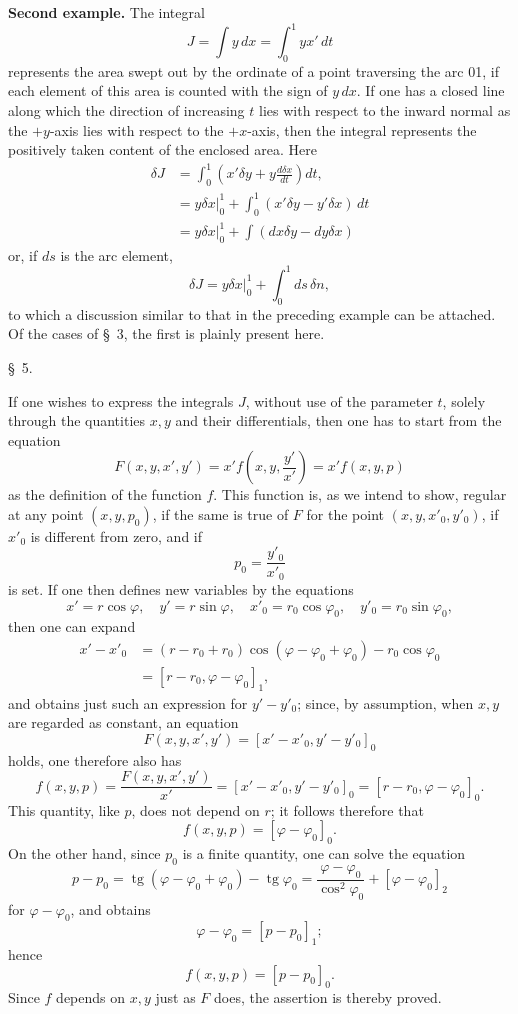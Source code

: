\documentclass[11pt,a4paper,leqno]{article}
\begin{document}
\medskip
\noindent\textbf{Second example.} The integral
\[
J=\int y\,dx=\int_0^1yx'\,dt
\]
represents the area swept out by the ordinate of a point traversing the arc 01, if each element of this area is counted with the sign of \(y\,dx\). If one has a closed line along which the direction of increasing \(t\) lies with respect to the inward normal as the \(+y\)-axis lies with respect to the \(+x\)-axis, then the integral represents the positively taken content of the enclosed area. Here
\[
\begin{aligned}
\delta J
&=\int_0^1\left(x'\delta y+y\frac{d\delta x}{dt}\right)dt,\\
&=y\delta x\bigg|_0^1+\int_0^1(x'\delta y-y'\delta x)\,dt\\
&=y\delta x\bigg|_0^1+\int(dx\delta y-dy\delta x)
\end{aligned}
\]
or, if \(ds\) is the arc element,
\[
\delta J=y\delta x\bigg|_0^1+\int_0^1ds\,\delta n,
\]
to which a discussion similar to that in the preceding example can be attached. Of the cases of \S~3, the first is plainly present here.

\begin{center}
\S~5.
\end{center}

If one wishes to express the integrals \(J\), without use of the parameter \(t\), solely through the quantities \(x,y\) and their differentials, then one has to start from the equation
\[
F(x,y,x',y')=x'f\left(x,y,\frac{y'}{x'}\right)=x'f(x,y,p)
\]
as the definition of the function \(f\). This function is, as we
intend to show, regular at any point \((x,y,p_0)\), if the same is true of \(F\) for the point \((x,y,x'_0,y'_0)\), if \(x'_0\) is different from zero, and if
\[
p_0=\frac{y'_0}{x'_0}
\]
is set. If one then defines new variables by the equations
\[
x'=r\cos\varphi,\quad y'=r\sin\varphi,\quad x'_0=r_0\cos\varphi_0,\quad y'_0=r_0\sin\varphi_0,
\]
then one can expand
\[
\begin{aligned}
x'-x'_0&=(r-r_0+r_0)\cos(\varphi-\varphi_0+\varphi_0)-r_0\cos\varphi_0\\
&=[r-r_0,\varphi-\varphi_0]_1,
\end{aligned}
\]
and obtains just such an expression for \(y'-y'_0\); since, by assumption, when \(x,y\) are regarded as constant, an equation
\[
F(x,y,x',y')=[x'-x'_0,y'-y'_0]_0
\]
holds, one therefore also has
\[
f(x,y,p)=\frac{F(x,y,x',y')}{x'}=[x'-x'_0,y'-y'_0]_0=[r-r_0,\varphi-\varphi_0]_0.
\]
This quantity, like \(p\), does not depend on \(r\); it follows therefore that
\[
f(x,y,p)=[\varphi-\varphi_0]_0.
\]
On the other hand, since \(p_0\) is a finite quantity, one can solve the equation
\[
p-p_0=\operatorname{tg}(\varphi-\varphi_0+\varphi_0)-\operatorname{tg}\varphi_0
=\frac{\varphi-\varphi_0}{\cos^2\varphi_0}+[\varphi-\varphi_0]_2
\]
for \(\varphi-\varphi_0\), and obtains
\[
\varphi-\varphi_0=[p-p_0]_1;
\]
hence
\[
f(x,y,p)=[p-p_0]_0.
\]
Since \(f\) depends on \(x,y\) just as \(F\) does, the assertion is thereby proved.
\end{document}
